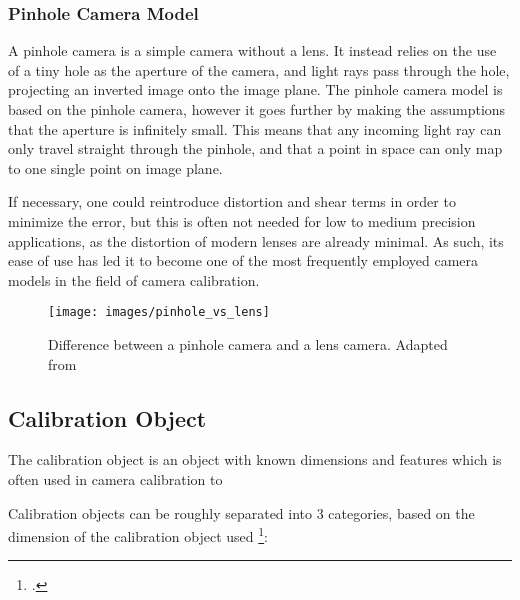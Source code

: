 \subsubsection{Pinhole Camera Model}

A pinhole camera is a simple camera without a lens. It instead relies on the use of a tiny hole as the aperture of the camera, and light rays pass through the hole, projecting an inverted image onto the image plane. The pinhole camera model is based on the pinhole camera, however it goes further by making the assumptions that the aperture is infinitely small. This means that any incoming light ray can only travel straight through the pinhole, and that a point in space can only map to one single point on image plane. 

If necessary, one could reintroduce distortion and shear terms in order to minimize the error, but this is often not needed for low to medium precision applications, as the distortion of modern lenses are already minimal. As such, its ease of use has led it to become one of the most frequently employed camera models in the field of camera calibration. 

\begin{figure}
    \centering
    \texttt{[image: images/pinhole\_vs\_lens]}
    \caption{Difference between a pinhole camera and a lens camera. Adapted from \cite{leCameraModel2018}}
\end{figure}

\subsection{Calibration Object}

The calibration object is an object with known dimensions and features which is often used in camera calibration to 


Calibration objects can be roughly separated into 3 categories, based on the dimension of the calibration object used \footcite{zhangCameraCalibration2007}:

